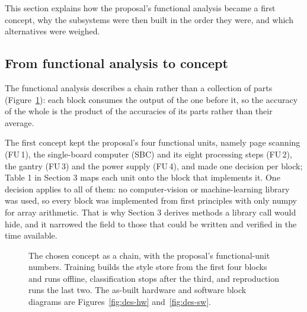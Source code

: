 \label{sec:approach}
This section explains how the proposal's functional analysis became a first concept, why the subsystems were then built in the order they were, and which alternatives were weighed.

\subsection{From functional analysis to concept}
\label{sec:app-concept}

The functional analysis describes a chain rather than a collection of parts (Figure~\ref{fig:app-concept}): each block consumes the output of the one before it, so the accuracy of the whole is the product of the accuracies of its parts rather than their average.

The first concept kept the proposal's four functional units, namely page scanning (FU\,1), the single-board computer (SBC) and its eight processing steps (FU\,2), the gantry (FU\,3) and the power supply (FU\,4), and made one decision per block; Table 1 in Section 3 maps each unit onto the block that implements it. One decision applies to all of them: no computer-vision or machine-learning library was used, so every block was implemented from first principles with only numpy for array arithmetic. That is why Section 3 derives methods a library call would hide, and it narrowed the field to those that could be written and verified in the time available.

\begin{figure}[htbp]
\centering
{}
\caption{The chosen concept as a chain, with the proposal's functional-unit numbers. Training builds the style store from the first four blocks and runs offline, classification stops after the third, and reproduction runs the last two. The as-built hardware and software block diagrams are Figures~\ref{fig:des-hw} and~\ref{fig:des-sw}.}
\label{fig:app-concept}
\end{figure}

